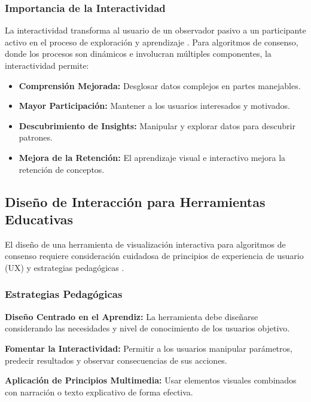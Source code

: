 \documentclass[spanish,12pt,letterpaper]{report}
\begin{document}
\subsubsection{Importancia de la Interactividad}

La interactividad transforma al usuario de un observador pasivo a un participante activo en el proceso de exploración y aprendizaje \parencite{algocademy2025algorithm}. Para algoritmos de consenso, donde los procesos son dinámicos e involucran múltiples componentes, la interactividad permite:

\begin{itemize}
    \item \textbf{Comprensión Mejorada:} Desglosar datos complejos en partes manejables.
    \item \textbf{Mayor Participación:} Mantener a los usuarios interesados y motivados.
    \item \textbf{Descubrimiento de Insights:} Manipular y explorar datos para descubrir patrones.
    \item \textbf{Mejora de la Retención:} El aprendizaje visual e interactivo mejora la retención de conceptos.
\end{itemize}

\subsection{Diseño de Interacción para Herramientas Educativas}

El diseño de una herramienta de visualización interactiva para algoritmos de consenso requiere consideración cuidadosa de principios de experiencia de usuario (UX) y estrategias pedagógicas \parencite{justinmind2025elearning}.

\subsubsection{Estrategias Pedagógicas}

\textbf{Diseño Centrado en el Aprendiz:} La herramienta debe diseñarse considerando las necesidades y nivel de conocimiento de los usuarios objetivo.

\textbf{Fomentar la Interactividad:} Permitir a los usuarios manipular parámetros, predecir resultados y observar consecuencias de sus acciones.

\textbf{Aplicación de Principios Multimedia:} Usar elementos visuales combinados con narración o texto explicativo de forma efectiva.
\end{document}
